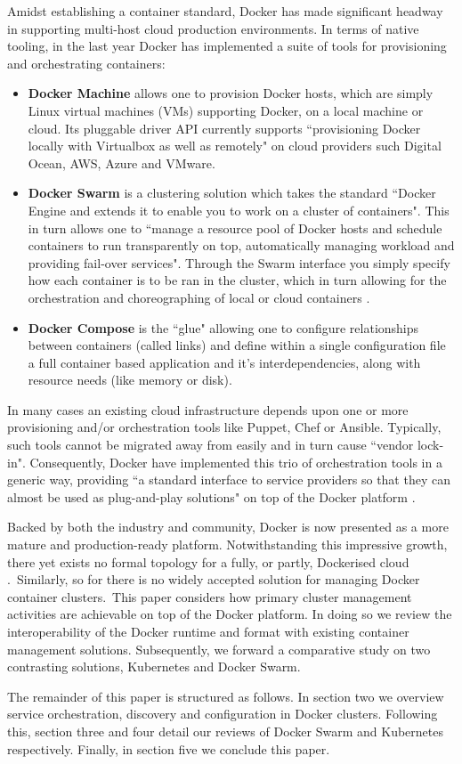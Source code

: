 \documentclass{article}
\begin{document}
\par
Amidst establishing a container standard, Docker has made significant headway in 
supporting multi-host cloud production environments. In terms of native tooling, in the last year Docker has implemented
a suite of tools for provisioning and orchestrating containers:
\begin{itemize}
\item \textbf{Docker Machine} allows one to provision Docker hosts, which are simply Linux virtual machines (VMs) supporting Docker, on a local machine or cloud. 
Its pluggable driver API currently supports ``provisioning Docker locally with Virtualbox as well as remotely" on cloud providers such Digital Ocean, AWS, Azure and VMware.
\item \textbf{Docker Swarm} is a clustering solution which takes the standard 
``Docker Engine and extends it to enable you to work on a cluster of containers". 
This in turn allows one to ``manage a resource pool of Docker hosts and schedule
containers to run transparently on top, automatically managing workload and providing fail-over services". Through the Swarm interface 
you simply specify how each container is to be ran in the cluster, which in turn allowing for the orchestration and choreographing of local or cloud containers \citep{holla}.
\item \textbf{Docker Compose} is the ``glue" allowing one to configure relationships between containers (called links) and define within a single configuration file a full container based application and it's interdependencies, along with resource needs (like memory or disk).
\end{itemize}
\noindent In many cases an existing cloud infrastructure depends upon one or more provisioning and/or orchestration tools like 
Puppet, Chef or Ansible. Typically, such tools cannot be migrated away from easily and in turn cause ``vendor lock-in".
Consequently, Docker have implemented this trio of orchestration tools in a generic way, 
providing ``a standard interface to service providers so that they can almost be used as plug-and-play solutions" on top of the Docker platform \citep{holla}.
\par
Backed by both the industry and community, Docker is now presented as a more mature and production-ready
platform. Notwithstanding this impressive growth, there yet exists no
formal topology for a fully, or partly, Dockerised cloud \citep{Claus}.\ Similarly,
so for there is no widely accepted solution for managing 
Docker container clusters.\
 This paper considers how primary cluster management activities are achievable on top of the Docker platform.
In doing so we review the interoperability of the Docker runtime and format with existing 
container management solutions. Subsequently, we forward a comparative study
on two contrasting solutions, Kubernetes and Docker Swarm. 
\par
The remainder of this paper is structured as follows. In
section two we overview service orchestration, discovery and configuration in Docker clusters. Following this, section three and four detail our
reviews of Docker Swarm and Kubernetes respectively. Finally, in section five we conclude this paper.
\end{document}
